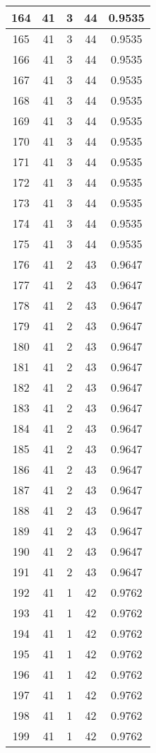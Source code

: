\documentclass[letterpaper, 12pt]{article}
\begin{document}
\begin{longtable}{|c|c|c|c|c|}
\hline
164 & 41 & 3 & 44 & 0.9535 \\
\hline
165 & 41 & 3 & 44 & 0.9535 \\
\hline
166 & 41 & 3 & 44 & 0.9535 \\
\hline
167 & 41 & 3 & 44 & 0.9535 \\
\hline
168 & 41 & 3 & 44 & 0.9535 \\
\hline
169 & 41 & 3 & 44 & 0.9535 \\
\hline
170 & 41 & 3 & 44 & 0.9535 \\
\hline
171 & 41 & 3 & 44 & 0.9535 \\
\hline
172 & 41 & 3 & 44 & 0.9535 \\
\hline
173 & 41 & 3 & 44 & 0.9535 \\
\hline
174 & 41 & 3 & 44 & 0.9535 \\
\hline
175 & 41 & 3 & 44 & 0.9535 \\
\hline
176 & 41 & 2 & 43 & 0.9647 \\
\hline
177 & 41 & 2 & 43 & 0.9647 \\
\hline
178 & 41 & 2 & 43 & 0.9647 \\
\hline
179 & 41 & 2 & 43 & 0.9647 \\
\hline
180 & 41 & 2 & 43 & 0.9647 \\
\hline
181 & 41 & 2 & 43 & 0.9647 \\
\hline
182 & 41 & 2 & 43 & 0.9647 \\
\hline
183 & 41 & 2 & 43 & 0.9647 \\
\hline
184 & 41 & 2 & 43 & 0.9647 \\
\hline
185 & 41 & 2 & 43 & 0.9647 \\
\hline
186 & 41 & 2 & 43 & 0.9647 \\
\hline
187 & 41 & 2 & 43 & 0.9647 \\
\hline
188 & 41 & 2 & 43 & 0.9647 \\
\hline
189 & 41 & 2 & 43 & 0.9647 \\
\hline
190 & 41 & 2 & 43 & 0.9647 \\
\hline
191 & 41 & 2 & 43 & 0.9647 \\
\hline
192 & 41 & 1 & 42 & 0.9762 \\
\hline
193 & 41 & 1 & 42 & 0.9762 \\
\hline
194 & 41 & 1 & 42 & 0.9762 \\
\hline
195 & 41 & 1 & 42 & 0.9762 \\
\hline
196 & 41 & 1 & 42 & 0.9762 \\
\hline
197 & 41 & 1 & 42 & 0.9762 \\
\hline
198 & 41 & 1 & 42 & 0.9762 \\
\hline
199 & 41 & 1 & 42 & 0.9762 \\
\hline
\end{longtable}
\end{document}
